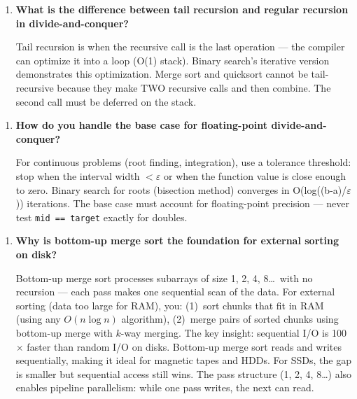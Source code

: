 \begin{enumerate}
\item \textbf{What is the difference between tail recursion and regular recursion in divide-and-conquer?}

Tail recursion is when the recursive call is the last operation — the compiler can optimize it into a loop (O(1) stack). Binary search's iterative version demonstrates this optimization. Merge sort and quicksort cannot be tail-recursive because they make TWO recursive calls and then combine. The second call must be deferred on the stack.
\end{enumerate}

\begin{enumerate}
\item \textbf{How do you handle the base case for floating-point divide-and-conquer?}

For continuous problems (root finding, integration), use a tolerance threshold: stop when the interval width $< \varepsilon$ or when the function value is close enough to zero. Binary search for roots (bisection method) converges in O(log((b-a)/$\varepsilon$)) iterations. The base case must account for floating-point precision — never test \texttt{mid == target} exactly for doubles.
\end{enumerate}

\begin{enumerate}
\item \textbf{Why is bottom-up merge sort the foundation for external sorting on disk?}

Bottom-up merge sort processes subarrays of size 1, 2, 4, 8\ldots\ with no recursion --- each pass makes one sequential scan of the data. For external sorting (data too large for RAM), you: (1)~sort chunks that fit in RAM (using any $O(n \log n)$ algorithm), (2)~merge pairs of sorted chunks using bottom-up merge with $k$-way merging. The key insight: sequential I/O is 100$\times$ faster than random I/O on disks. Bottom-up merge sort reads and writes sequentially, making it ideal for magnetic tapes and HDDs. For SSDs, the gap is smaller but sequential access still wins. The pass structure (1, 2, 4, 8\ldots) also enables pipeline parallelism: while one pass writes, the next can read.
\end{enumerate}

